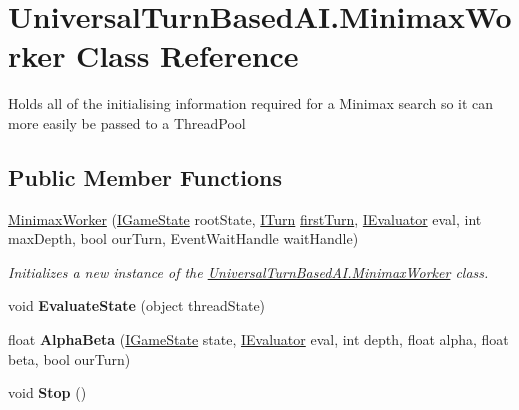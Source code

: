 \hypertarget{class_universal_turn_based_a_i_1_1_minimax_worker}{}\section{Universal\+Turn\+Based\+A\+I.\+Minimax\+Worker Class Reference}
\label{class_universal_turn_based_a_i_1_1_minimax_worker}


Holds all of the initialising information required for a Minimax search so it can more easily be passed to a Thread\+Pool  


\subsection*{Public Member Functions}
\begin{DoxyCompactItemize}
\item 
\hyperlink{class_universal_turn_based_a_i_1_1_minimax_worker_aefc299364d8cbc30ebb6caba179703d7}{Minimax\+Worker} (\hyperlink{interface_universal_turn_based_a_i_1_1_i_game_state}{I\+Game\+State} root\+State, \hyperlink{interface_universal_turn_based_a_i_1_1_i_turn}{I\+Turn} \hyperlink{class_universal_turn_based_a_i_1_1_minimax_worker_a7b1186503a4def5fa695b58502d05c9b}{first\+Turn}, \hyperlink{interface_universal_turn_based_a_i_1_1_i_evaluator}{I\+Evaluator} eval, int max\+Depth, bool our\+Turn, Event\+Wait\+Handle wait\+Handle)
\begin{DoxyCompactList}\small\item\em Initializes a new instance of the \hyperlink{class_universal_turn_based_a_i_1_1_minimax_worker}{Universal\+Turn\+Based\+A\+I.\+Minimax\+Worker} class. \end{DoxyCompactList}\item 
\hypertarget{class_universal_turn_based_a_i_1_1_minimax_worker_a3003a7a26d65f3e6ef877f21c7c7d307}{}void {\bfseries Evaluate\+State} (object thread\+State)\label{class_universal_turn_based_a_i_1_1_minimax_worker_a3003a7a26d65f3e6ef877f21c7c7d307}

\item 
\hypertarget{class_universal_turn_based_a_i_1_1_minimax_worker_ad9b6596f36acc2970d865c8b4a29d882}{}float {\bfseries Alpha\+Beta} (\hyperlink{interface_universal_turn_based_a_i_1_1_i_game_state}{I\+Game\+State} state, \hyperlink{interface_universal_turn_based_a_i_1_1_i_evaluator}{I\+Evaluator} eval, int depth, float alpha, float beta, bool our\+Turn)\label{class_universal_turn_based_a_i_1_1_minimax_worker_ad9b6596f36acc2970d865c8b4a29d882}

\item 
\hypertarget{class_universal_turn_based_a_i_1_1_minimax_worker_aaf19d669a25879a067716e12af1326be}{}void {\bfseries Stop} ()\label{class_universal_turn_based_a_i_1_1_minimax_worker_aaf19d669a25879a067716e12af1326be}

\end{DoxyCompactItemize}
